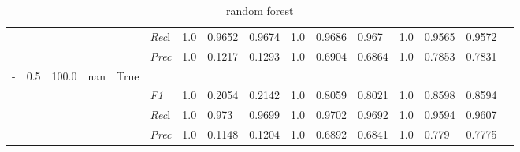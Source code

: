 \begin{table}[]
\begin{tabularx}{\textwidth}{XXXXX|X|XXX|XXX|XXXX}
    & & & & & \textit{Rec}l & 1.0 & 0.9652 & 0.9674    & 1.0 & 0.9686    & 0.967    & 1.0    & 0.9565    & 0.9572    \\
    & & & & & \textit{Prec} & 1.0 & 0.1217 & 0.1293 & 1.0 & 0.6904 & 0.6864 & 1.0 & 0.7853 & 0.7831 \\ \midrule
    - & 0.5 & 100.0 & nan & True& & & & & & & & & \\
    & & & & & \textit{F1} & 1.0 & 0.2054 & 0.2142 & 1.0 & 0.8059        & 0.8021        & 1.0        & 0.8598        & 0.8594        \\
    & & & & & \textit{Rec}l & 1.0 & 0.973 & 0.9699    & 1.0 & 0.9702    & 0.9692    & 1.0    & 0.9594    & 0.9607    \\
    & & & & & \textit{Prec} & 1.0 & 0.1148 & 0.1204 & 1.0 & 0.6892 & 0.6841 & 1.0 & 0.779 & 0.7775 \\ \midrule
    \end{tabularx}
    \caption{random forest}
    \label{tab:all_results_random_forest}
    \end{table}
    
